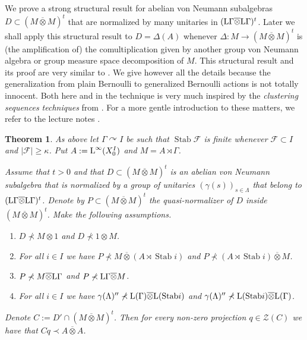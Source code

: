 \documentclass[a4paper,11pt]{amsart}
\numberwithin{equation}{section}
\newtheorem{theorem}[definition]{Theorem}
\begin{document}
We prove a strong structural result for abelian von Neumann subalgebras $D \subset (M {\mathbin{\overline{\otimes}}} M)^t$ that are normalized by many unitaries in $({\mathord{\text{\rm L}}} \Gamma {\mathbin{\overline{\otimes}}} {\mathord{\text{\rm L}}} \Gamma)^t$. Later we shall apply this structural result to $D = \Delta(A)$ whenever $\Delta : M {\rightarrow} (M {\mathbin{\overline{\otimes}}} M)^t$ is (the amplification of) the comultiplication given by another group von Neumann algebra or group measure space decomposition of $M$. This structural result and its proof are very similar to \cite[Theorem 6.1]{Io10}. We give however all the details because the generalization from plain Bernoulli to generalized Bernoulli actions is not totally innocent.
Both here and in \cite{Io10} the technique is very much inspired by the \emph{clustering sequences techniques} from \cite[Sections 1-4]{Po04}. For a more gentle introduction to these matters, we refer to the lecture notes \cite{Va11}.

\begin{theorem}\label{thm.intertwine-abelian}
As above let $\Gamma {\curvearrowright} I$ be such that ${\operatorname{Stab}} {\mathcal{F}}$ is finite whenever ${\mathcal{F}} \subset I$ and $|{\mathcal{F}}| {\geqslant} \kappa$. Put $A := {\mathord{\text{\rm L}}}^\infty(X_0^I)$ and $M = A \rtimes \Gamma$.

Assume that $t > 0$ and that $D \subset (M {\mathbin{\overline{\otimes}}} M)^t$ is an abelian von Neumann subalgebra that is normalized by a group of unitaries $(\gamma(s))_{s \in \Lambda}$ that belong to $({\mathord{\text{\rm L}}} \Gamma {\mathbin{\overline{\otimes}}} {\mathord{\text{\rm L}}} \Gamma)^t$. Denote by $P \subset (M {\mathbin{\overline{\otimes}}} M)^t$ the quasi-normalizer of $D$ inside $(M {\mathbin{\overline{\otimes}}} M)^t$. Make the following assumptions.

\begin{enumerate}
\item\label{assum1} $D \not\prec M {\otimes} 1$ and $D \not\prec 1 {\otimes} M$.
\item\label{assum2} For all $i \in I$ we have $P \not\prec M {\mathbin{\overline{\otimes}}} (A \rtimes {\operatorname{Stab}} i)$ and $P \not\prec (A \rtimes {\operatorname{Stab}} i) {\mathbin{\overline{\otimes}}} M$.
\item\label{assum3} $P \not\prec M {\mathbin{\overline{\otimes}}} {\mathord{\text{\rm L}}} \Gamma$ and $P \not\prec {\mathord{\text{\rm L}}} \Gamma {\mathbin{\overline{\otimes}}} M$.
\item\label{assum4} For all $i \in I$ we have $\gamma(\Lambda){^{\prime\prime}} \not\prec {\mathord{\text{\rm L}}}(\Gamma) {\mathbin{\overline{\otimes}}} {\mathord{\text{\rm L}}}({\operatorname{Stab}} i)$ and $\gamma(\Lambda){^{\prime\prime}} \not\prec {\mathord{\text{\rm L}}}({\operatorname{Stab}} i) {\mathbin{\overline{\otimes}}} {\mathord{\text{\rm L}}}(\Gamma)$.
\end{enumerate}

Denote $C := D' \cap (M {\mathbin{\overline{\otimes}}} M)^t$. Then for every non-zero projection $q \in {\mathcal{Z}}(C)$ we have that $Cq \prec A {\mathbin{\overline{\otimes}}} A$.
\end{theorem}
\end{document}
